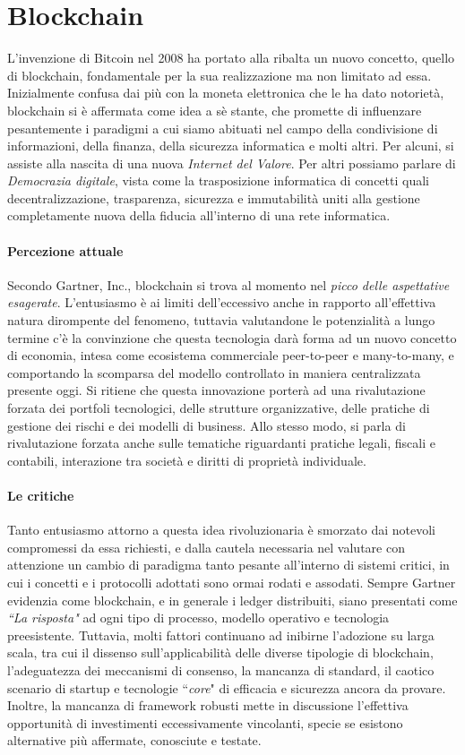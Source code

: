 \section{Blockchain}
	L'invenzione di Bitcoin nel 2008 ha portato alla ribalta un nuovo concetto, quello di blockchain, fondamentale per la sua realizzazione ma non limitato ad essa. Inizialmente confusa dai più con la moneta elettronica che le ha dato notorietà,  blockchain si è affermata come idea a sè stante, che promette di influenzare pesantemente i paradigmi a cui siamo abituati nel campo della condivisione di informazioni, della finanza, della sicurezza informatica e molti altri. Per alcuni, si assiste alla nascita di una nuova \emph{Internet del Valore}. Per altri possiamo parlare di \emph{Democrazia digitale}, vista come la trasposizione informatica di concetti quali decentralizzazione, trasparenza, sicurezza e immutabilità uniti alla gestione completamente nuova della fiducia all'interno di una rete informatica.
	\paragraph{Percezione attuale} Secondo Gartner, Inc.\cite{gartner}, blockchain si trova al momento nel \emph{picco delle aspettative esagerate}. L'entusiasmo è ai limiti dell'eccessivo anche in rapporto all'effettiva natura dirompente del fenomeno, tuttavia valutandone le potenzialità a lungo termine c'è la convinzione che questa tecnologia darà forma ad un nuovo concetto di economia, intesa come ecosistema commerciale peer-to-peer e many-to-many, e comportando la scomparsa del modello controllato in maniera centralizzata presente oggi. Si ritiene che questa innovazione porterà ad una rivalutazione forzata dei portfoli tecnologici, delle strutture organizzative, delle pratiche di gestione dei rischi e dei modelli di business. Allo stesso modo, si parla di rivalutazione forzata anche sulle tematiche riguardanti pratiche legali, fiscali e contabili, interazione tra società e diritti di proprietà individuale.
	\paragraph{Le critiche} Tanto entusiasmo attorno a questa idea rivoluzionaria è smorzato dai notevoli compromessi da essa richiesti, e dalla cautela necessaria nel valutare con attenzione un cambio di paradigma tanto pesante all'interno di sistemi critici, in cui i concetti e i protocolli adottati sono ormai rodati e assodati. Sempre Gartner evidenzia come blockchain, e in generale i ledger distribuiti, siano presentati come \emph{``La risposta"} ad ogni tipo di processo, modello operativo e tecnologia preesistente. Tuttavia, molti fattori continuano ad inibirne l'adozione su larga scala, tra cui il dissenso sull'applicabilità delle diverse tipologie di blockchain, l'adeguatezza dei meccanismi di consenso, la mancanza di standard, il caotico scenario di startup e tecnologie ``\emph{core}" di efficacia e sicurezza ancora da provare. Inoltre, la mancanza di framework robusti mette in discussione l'effettiva opportunità di investimenti eccessivamente vincolanti, specie se esistono alternative più affermate, conosciute e testate.

